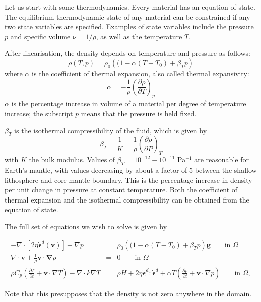 Let us start with some thermodynamics. Every material has an equation of state.
The equilibrium thermodynamic state of any material can
be constrained if any two state variables are specified.
Examples of state variables include
the pressure $p$ and specific volume $\nu = 1/\rho$, as well as the temperature $T$.

After linearisation, the density depends on temperature and pressure as follows:
\[
\rho(T,p) = \rho_0 \left((1 - \alpha(T-T_0) + \beta_T p \right)
\]
where $\alpha$ is the coefficient of thermal expansion, also called 
thermal expansivity: 
\[
\alpha=-\frac{1}{\rho}\left( \frac{\partial \rho}{\partial T} \right)_p
\]
$\alpha$ is the percentage increase in volume of a material per degree of temperature increase; the
subscript $p$ means that the pressure is held fixed.

$\beta_T$ is the isothermal compressibility of the fluid, which is given by 
\[
\beta_T = \frac{1}{K} = \frac{1}{\rho}\left( \frac{\partial \rho}{\partial P} \right)_T
\]
with $K$ the bulk modulus. 
Values of $\beta_T=10^{-12}-10^{-11}$ Pa$^{-1}$ are reasonable for Earth's mantle, with values decreasing by about a
factor of 5 between the shallow lithosphere and core-mantle boundary.
This is the percentage increase in density per unit change in pressure at constant temperature.
Both the coefficient of thermal expansion and the isothermal compressibility can be obtained
from the equation of state.

The full set of equations we wish to solve is given by

\begin{eqnarray}
-\nabla \cdot \left[2\eta \dot{\bm \epsilon}^d({\bm v}) \right] + \nabla p &=& \rho_0 \left((1 - \alpha(T-T_0) + \beta_T p \right) {\bm g} \quad\quad \textrm{in $\Omega$}  \label{eq:stokes-1} \\
\nabla \cdot {\bm v} + \frac{1}{\rho} {\bm v} \cdot {\bm \nabla}\rho&=&0 \quad\quad  \textrm{in $\Omega$}   \label{eq:stokes-2} \\
\rho C_p \left(\frac{\partial T}{\partial t} + \bm v\cdot\nabla T\right) - \nabla\cdot k\nabla T   &=& 
  \rho H  +  2\eta \dot{\bm \epsilon}^d : \dot{\bm \epsilon}^d    +\alpha T \left( \frac{\partial p}{\partial t}+  \bm v \cdot \nabla p \right) 
\quad\quad   \textrm{in $\Omega$},
  \label{eq:temperature}
\end{eqnarray}

Note that this presupposes that the density is not zero anywhere in the domain.

